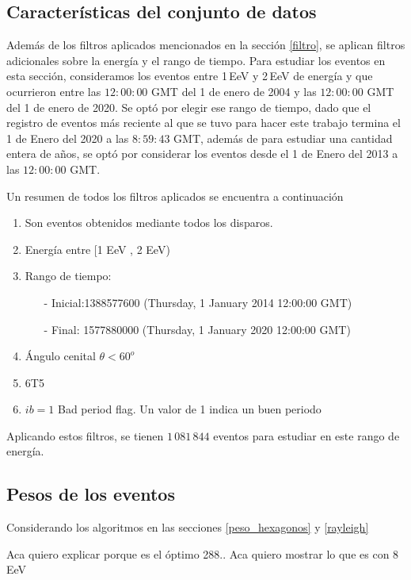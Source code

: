 	\subsection{Características del conjunto de datos} \label{specs}
	

	Además de los filtros aplicados mencionados en la sección \ref{filtro}, se aplican filtros adicionales sobre la energía y el rango de tiempo. Para estudiar los eventos en esta sección, consideramos los eventos entre 1\,EeV y 2\,EeV de energía y que ocurrieron entre las $12:00:00$ GMT del 1 de enero de 2004 y las $12:00:00$ GMT del 1 de enero de 2020. Se optó por elegir ese rango de tiempo, dado que el registro de eventos más reciente al que se tuvo para hacer este trabajo termina el 1 de Enero del 2020   a las $8:59:43$ GMT, además de para estudiar una cantidad entera de años, se optó por considerar los eventos desde el 1 de Enero del 2013 a las $12:00:00 $ GMT.

	Un resumen de todos los filtros aplicados se encuentra a continuación
		\begin{enumerate}
			\item Son eventos obtenidos mediante todos los disparos.
			\item Energía entre  [1 EeV , 2 EeV)
			\item Rango de tiempo:
			\begin{itemize}
				\item[-] Inicial:1388577600 (Thursday, 1 January 2014 12:00:00 GMT)
				\item[-] Final: 1577880000  (Thursday, 1 January 2020 12:00:00 GMT)
			\end{itemize}
			\item Ángulo cenital $\theta < 60^o$
			\item 6T5
			\item $ib=1$ Bad period flag. Un valor de 1 indica un buen periodo
		\end{enumerate}
	Aplicando estos filtros, se tienen $1\,081\,844$ eventos para estudiar en este rango de energía.


\subsection{Pesos de los eventos}

Considerando los algoritmos en las secciones \ref{peso_hexagonos} y \ref{rayleigh}


Aca quiero explicar porque es el óptimo 288..
Aca quiero mostrar lo que es con 8 EeV
		
